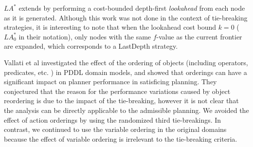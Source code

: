 
$LA^*$ \cite{stern2010look} extends \astar by performing a
cost-bounded depth-first \emph{lookahead} from each node as it is generated.
Although this work was not done in the context of tie-breaking strategies, it is interesting to note that 
when the lookahead cost bound $k=0$ ($LA^*_0$ in their notation), only nodes with the same $f$-value as the current \astar frontier are expanded, which corresponds to a LastDepth strategy.

Vallati et al  investigated the effect
of the ordering of objects (including operators, predicates, etc. ) in
PDDL domain models, and showed that orderings can have a significant
impact on planner performance in satisficing planning.
They conjectured that the reason for the performance variations caused
by object reordering is due to the impact of the tie-breaking,
however it is not clear that the analysis can be
directly applicable to the admissible planning.
We avoided the effect of action orderings by using the randomized third
tie-breakings.
In contrast, we continued to use the variable ordering in the original domains
because the effect of variable ordering is irrelevant to the tie-breaking
criteria.

